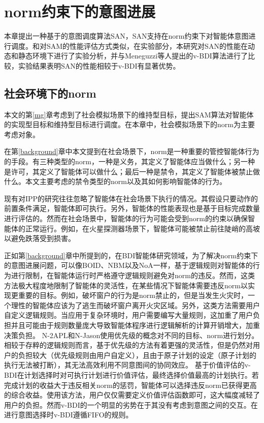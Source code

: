 \chapter{norm约束下的意图进展}\label{norm}
本章提出一种基于\SA 的意图调度算法SAN，SAN支持在norm约束下对智能体意图进行调度。和对SAM的性能评估方式类似，在实验部分，本研究对SAN的性能在动态和静态环境下进行了实验分析，并与Meneguzzi等人提出的v-BDI\cite{}算法进行了比较，实验结果表明SAN的性能相较于v-BDI有显著优势。
\section{社会环境下的norm}
本文的第\ref{mg}章考虑到了社会模拟场景下的维持型目标，提出SAM算法对智能体的实现型目标和维持型目标进行调度。在本章中，社会模拟场景下的norm为主要考虑对象。

在第\ref{background}章中本文提到在社会场景下，norm是一种重要的管控智能体行为的手段\cite{}。有三种类型的norm，一种是义务，其定义了智能体应当做什么；另一种是许可，其定义了智能体可以做什么；最后一种是禁令，其定义了智能体被禁止做什么。本文主要考虑的禁令类型的norm以及其如何影响智能体的行为。

现有对IPP的研究往往忽略了智能体在社会场景下执行的情况。其假设只要动作的前置条件满足，智能体即可执行。另外，智能体的性能表现也是基于目标完成数量进行评估的。然而在社会场景中，智能体的行为可能会受到norm的约束以确保智能体的正常运行。例如，在火星探测器场景下，智能体可能被禁止前往陡峭的高坡以避免跌落受到损害。

正如第\ref{background}章中所提到的，在BDI智能体研究领域，为了解决norm约束下的意图进展问题，可以像BOID\cite{}、NBM以及NoA\cite{}一样，基于逻辑规则对智能体的行为进行限制，在智能体运行时严格遵守逻辑规则避免对norm的违反。然而，这类方法极大程度地限制了智能体的灵活性，在某些情况下智能体需要违反norm以实现更重要的目标。例如，破坏窗户的行为是norm禁止的，但是当发生火灾时，一个理性的智能体应该为了逃生而破坏窗户离开火灾区域。另外，这类方法需要用户自定义逻辑规则。当应用于复杂环境时，用户需要编写大量规则，这加重了用户负担并且可能由于规则数量庞大导致智能体程序进行逻辑解析的计算开销增大，加重决策负担。
N-2APL\cite{}和N-Jason\cite{}使用优先级的概念对不同的目标、norm进行划分。相较于存粹的逻辑规则而言，基于优先级的方法有着更强的灵活性，但是仍然对用户的负担较大（优先级规则由用户自定义），且由于原子计划的设定（原子计划的执行无法被打断），其无法高效利用不同意图间的协同效应。
基于价值评估的v-BDI\cite{}在计划选择时对可执行计划进行价值评估，最终选择价值最高的计划执行。若完成计划的收益大于违反相关norm的惩罚，智能体可以选择违反norm已获得更高的综合收益。使用该方法，用户仅仅需要定义价值评估函数即可，这大幅度减轻了用户的负担。然而v-BDI的一个明显的劣势在于其没有考虑到意图之间的交互。在进行意图选择时v-BDI遵循FIFO的规则。

